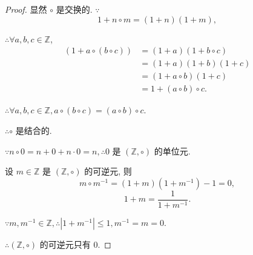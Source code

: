 \documentclass{ctexart}
\begin{document}
\begin{proof}
    显然 $\circ$ 是交换的. $\because$
    \[1+n\circ m=(1+n)(1+m),\]

    $\therefore\forall a,b,c\in\mathbb{Z}$,
    \begin{align*}
        (1+a\circ(b\circ c)) & =(1+a)(1+b\circ c) \\
        & =(1+a)(1+b)(1+c) \\
        & =(1+a\circ b)(1+c) \\
        & =1+(a\circ b)\circ c.
    \end{align*}

    $\therefore\forall a,b,c\in\mathbb{Z},a\circ(b\circ c)=(a\circ b)\circ c$.

    $\therefore\circ$ 是结合的.

    $\because n\circ 0=n+0+n\cdot0=n,\therefore0$ 是 $(\mathbb{Z},\circ)$ 的单位元.

    设 $m\in\mathbb{Z}$ 是 $(\mathbb{Z},\circ)$ 的可逆元, 则
    \[m\circ m^{-1}=(1+m)(1+m^{-1})-1=0,\]
    \[1+m=\dfrac{1}{1+m^{-1}}.\]

    $\because m,m^{-1}\in\mathbb{Z},\therefore|1+m^{-1}|\leq1,m^{-1}=m=0$.

    $\therefore(\mathbb{Z},\circ)$ 的可逆元只有 $0$.
\end{proof}
\end{document}
